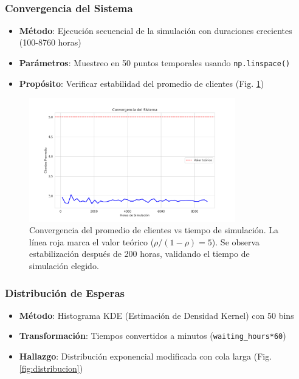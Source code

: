 \documentclass{article}
\begin{document}
\ 

\subsubsection{Convergencia del Sistema}
\begin{itemize}
    \item \textbf{Método}: Ejecución secuencial de la simulación con duraciones crecientes (100-8760 horas)
    \item \textbf{Parámetros}: Muestreo en 50 puntos temporales usando \texttt{np.linspace()}
    \item \textbf{Propósito}: Verificar estabilidad del promedio de clientes (Fig. \ref{fig:convergencia})
\end{itemize}

\begin{figure}[H]
    \centering
    \includegraphics[width=0.8\textwidth]{../images/convergencia.png}
    \caption{Convergencia del promedio de clientes vs tiempo de simulación. La línea roja marca el valor teórico ($\rho/(1-\rho)=5$). Se observa estabilización después de 200 horas, validando el tiempo de simulación elegido.}
    \label{fig:convergencia}
\end{figure}

\subsubsection{Distribución de Esperas}
\begin{itemize}
    \item \textbf{Método}: Histograma KDE (Estimación de Densidad Kernel) con 50 bins
    \item \textbf{Transformación}: Tiempos convertidos a minutos (\texttt{waiting\_hours*60})
    \item \textbf{Hallazgo}: Distribución exponencial modificada con cola larga (Fig. \ref{fig:distribucion})
\end{itemize}
\end{document}
